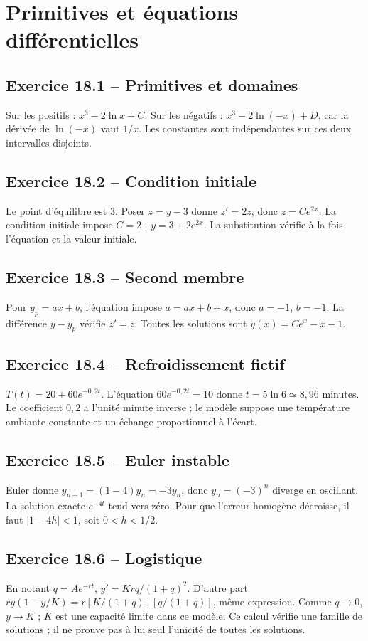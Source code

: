 \chapter{Primitives et équations différentielles}
\section*{Exercice 18.1 -- Primitives et domaines}
Sur les positifs : $x^3-2\ln x+C$. Sur les négatifs : $x^3-2\ln(-x)+D$, car la dérivée de $\ln(-x)$ vaut $1/x$. Les constantes sont indépendantes sur ces deux intervalles disjoints.

\section*{Exercice 18.2 -- Condition initiale}
Le point d'équilibre est $3$. Poser $z=y-3$ donne $z'=2z$, donc $z=Ce^{2x}$. La condition initiale impose $C=2$ : $y=3+2e^{2x}$. La substitution vérifie à la fois l'équation et la valeur initiale.

\section*{Exercice 18.3 -- Second membre}
Pour $y_p=ax+b$, l'équation impose $a=ax+b+x$, donc $a=-1$, $b=-1$. La différence $y-y_p$ vérifie $z'=z$. Toutes les solutions sont $y(x)=Ce^x-x-1$.

\section*{Exercice 18.4 -- Refroidissement fictif}
$T(t)=20+60e^{-0{,}2t}$. L'équation $60e^{-0{,}2t}=10$ donne $t=5\ln6\simeq8{,}96$ minutes. Le coefficient $0{,}2$ a l'unité minute inverse ; le modèle suppose une température ambiante constante et un échange proportionnel à l'écart.

\section*{Exercice 18.5 -- Euler instable}
Euler donne $y_{n+1}=(1-4)y_n=-3y_n$, donc $y_n=(-3)^n$ diverge en oscillant. La solution exacte $e^{-4t}$ tend vers zéro. Pour que l'erreur homogène décroisse, il faut $|1-4h|<1$, soit $0<h<1/2$.

\section*{Exercice 18.6 -- Logistique}
En notant $q=Ae^{-rt}$, $y'=Krq/(1+q)^2$. D'autre part $ry(1-y/K)=r[K/(1+q)][q/(1+q)]$, même expression. Comme $q\to0$, $y\to K$ ; $K$ est une capacité limite dans ce modèle. Ce calcul vérifie une famille de solutions ; il ne prouve pas à lui seul l'unicité de toutes les solutions.
